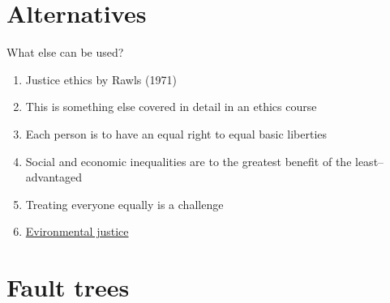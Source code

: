 \documentclass[aspectratio=1610,pdftex,dvipsnames,compress,xcolor={dvipsnames}]{beamer}
\begin{document}
\section{Alternatives}


\addtocounter{framenumber}{-1}
\begin{frame}{What else can be used?}
    \begin{enumerate}[series=outerlist,topsep=0pt,itemsep=21pt,leftmargin=*,label=(\arabic*)]
        \item[]Justice ethics by Rawls (1971)
        \item[]This is something else covered in detail in an ethics course
        \item[]Each person is to have an equal right to equal basic liberties
        \item[]Social and economic inequalities are to the greatest benefit of the least--advantaged
        \item[]Treating everyone equally is a challenge
        \item[]\href{https://www.epa.gov/environmentaljustice}{Evironmental justice}
    \end{enumerate}
\end{frame}


\section{Fault trees}
\end{document}

